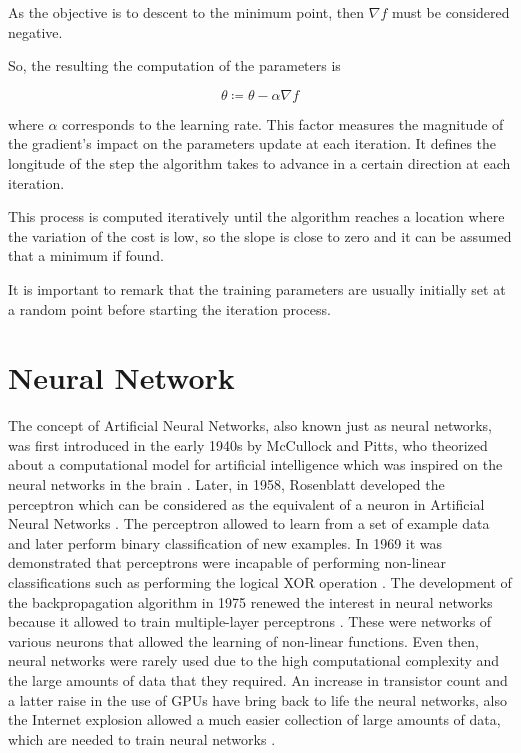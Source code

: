 \documentclass[a4paper, report, oneside, UKenglish]{memoir}
\begin{document}
As the objective is to descent to the minimum point, then $\nabla f$ must be considered negative. 

So, the resulting the computation of the parameters is

\begin{equation}
    \theta \coloneqq \theta - \alpha \nabla f
\end{equation}

where $\alpha$ corresponds to the learning rate. This factor measures the magnitude of the gradient's impact on the parameters update at each iteration. It defines the longitude of the step the algorithm takes to advance in a certain direction at each iteration. 

This process is computed iteratively until the algorithm reaches a location where the variation of the cost is low, so the slope is close to zero and it can be assumed that a minimum if found.

It is important to remark that the training parameters are usually initially set at a random point before starting the iteration process.














\section{Neural Network}
The concept of Artificial Neural Networks, also known just as neural networks, was first introduced in the early 1940s by McCullock and Pitts, who theorized about a computational model for artificial intelligence which was inspired on the neural networks in the brain \cite{mcculloch_logical_1943}. Later, in 1958, Rosenblatt developed the perceptron which can be considered as the equivalent of a neuron in Artificial Neural Networks \cite{rosenblatt_perceptron_1958}. The perceptron allowed to learn from a set of example data and later perform binary classification of new examples. In 1969 it was demonstrated that perceptrons were incapable of performing non-linear classifications such as performing the logical XOR operation \cite{minsky69perceptrons}. The development of the backpropagation algorithm in 1975 renewed the interest in neural networks because it allowed to train multiple-layer perceptrons \cite{werbos}. These were networks of various neurons that allowed the learning of non-linear functions. Even then, neural networks were rarely used due to the high computational complexity and the large amounts of data that they required. An increase in transistor count and a latter raise in the use of GPUs have bring back to life the neural networks, also the Internet explosion allowed a much easier collection of large amounts of data, which are needed to train neural networks \cite{aggarwal_neural_2018}.
\end{document}
